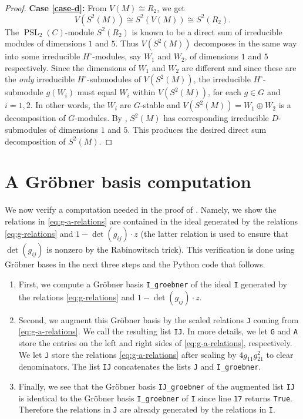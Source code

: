 \documentclass[11pt,reqno]{amsart}
\theoremstyle{definition}
\DeclareMathOperator{\PSL}{PSL}
\begin{document}
\begin{proof}
\textbf{Case \ref{case-d}:}
From $V(M)\cong R_{2}$, we get
\[
    V(S^{2}(M))\cong S^{2}(V(M))\cong S^{2}(R_{2}).
\] 
The $\PSL_{2}(C)$-module $S^{2}(R_{2})$ is known to be a direct sum of irreducible modules of dimensions $1$ and $5$. 
Thus $V(S^{2}(M))$ decomposes in the same way into some irreducible $H^{\circ}$-modules, say $W_1$ and $W_2$, of dimensions $1$ and $5$ respectively. Since the dimensions of $W_1$ and $W_2$ are different and since these are the \emph{only} irreducible $H^{\circ}$-submodules of $V(S^{2}(M))$, the irreducible $H^{\circ}$-submodule $g(W_i)$ must equal $W_i$ within $V(S^{2}(M))$, for each $g\in G$ and $i=1,2$. In other words, the $W_i$ are $G$-stable and $V(S^{2}(M))=W_1\oplus W_2$ is a decomposition of $G$-modules.
By , $S^{2}(M)$ has corresponding irreducible $D$-submodules of dimensions $1$ and $5$. This produces the desired direct sum decomposition of $S^{2}(M)$.
\end{proof}


\appendix

\section{A Gr\"obner basis computation}
\label{appendix:groebner}

We now verify a computation needed in the proof of . Namely, we show the relations in \eqref{eq:g-a-relations} are contained in the ideal generated by the relations \eqref{eq:g-relations} and $1-\det(g_{ij})\cdot z$ (the latter relation is used to ensure that $\det(g_{ij})$ is nonzero by the Rabinowitsch trick). This verification is done using Gröbner bases in the next three steps and the Python code that follows.
\begin{enumerate}
    \item First, we compute a Gröbner basis \texttt{I\_groebner} of the ideal \texttt{I} generated by the relations \eqref{eq:g-relations} and $1-\det(g_{ij})\cdot z$.
    \item Second, we augment this Gröbner basis by the scaled relations \texttt{J} coming from \eqref{eq:g-a-relations}. We call the resulting list \texttt{IJ}. In more details, we let \texttt{G} and \texttt{A} store the entries on the left and right sides of \eqref{eq:g-a-relations}, respectively.
    We let \texttt{J} store the relations \eqref{eq:g-a-relations} after scaling by $4g_{11}g_{21}^{2}$ to clear denominators. The list \texttt{IJ} concatenates the lists \texttt{J} and \texttt{I\_groebner}.
    \item Finally, we see that the Gröbner basis \texttt{IJ\_groebner} of the augmented list \texttt{IJ} is identical to the Gröbner basis \texttt{I\_groebner} of \texttt{I} since line \texttt{17} returns \texttt{True}. Therefore the relations in \texttt{J} are already generated by the relations in \texttt{I}.
\end{enumerate}
\end{document}
